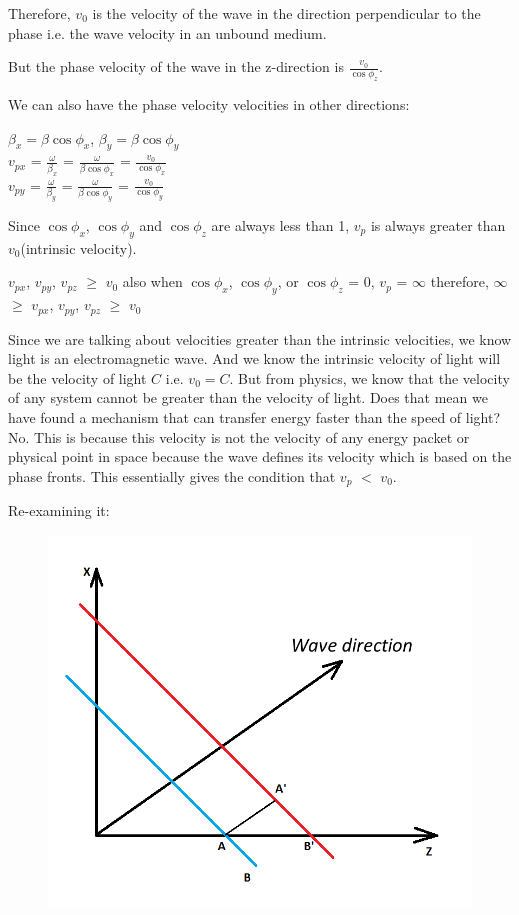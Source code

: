 Therefore, $v_0$ is the velocity of the wave in the direction perpendicular to the phase i.e. the wave velocity in an unbound medium.

But the phase velocity of the wave in the z-direction is $\frac{v_0}{\cos\phi_{z}}$.

We can also have the phase velocity velocities in other directions:
\begin{center}
$\beta_x = \beta\cos\phi_{x}$, $\beta_y = \beta\cos\phi_{y}$\\
$v_{px}$ = $\frac{\omega}{\beta_x}$ = $\frac{\omega}{\beta\cos\phi_{x}}$ = $\frac{v_0}{\cos\phi_{x}}$\\
$v_{py}$ = $\frac{\omega}{\beta_y}$ = $\frac{\omega}{\beta\cos\phi_{y}}$ = $\frac{v_0}{\cos\phi_{y}}$
\end{center}
Since $\cos\phi_{x}$, $\cos\phi_{y}$ and $\cos\phi_{z}$ are always less than 1, $v_p$ is always greater than $v_0$(intrinsic velocity).
\begin{center}
$v_{px}$, $v_{py}$, $v_{pz}$ $\geq$ $v_0$
also when $\cos\phi_{x}$, $\cos\phi_{y}$, or $\cos\phi_{z}$ = 0, $v_p$ = $\infty$
therefore, $\infty$ $\geq$ $v_{px}$, $v_{py}$, $v_{pz}$ $\geq$ $v_0$
\end{center}
Since we are talking about velocities greater than the intrinsic velocities, we know light is an electromagnetic wave. And we know the intrinsic velocity of light will be the velocity of light $C$ i.e. $v_0 = C$.
But from physics, we know that the velocity of any system cannot be greater than the velocity of light.
Does that mean we have found a mechanism that can transfer energy faster than the speed of light?
No. This is because this velocity is not the velocity of any energy packet or physical point in space because the wave defines its velocity which is based on the phase fronts. This essentially gives the condition that $v_p$ $<$ $v_0$.

Re-examining it:
\begin{figure}[h]
\centering
\includegraphics[width=.7\linewidth]{./graphics/phase_velocity_of_wave}
\caption{}
\label{fig:wave_with_constant_wave_fonts_in_xy_plane}
\end{figure}

